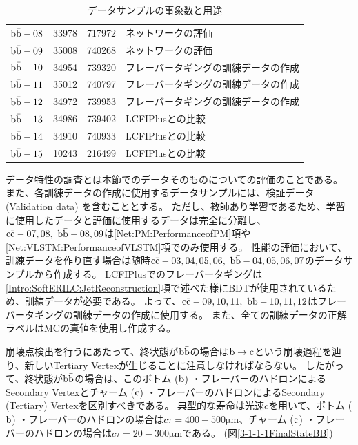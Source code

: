 \begin{table}[htb]
\begin{tabular}{c c c l}
    $\rm b\bar{b}-08$ & 33978 & 717972 & ネットワークの評価\\ 
    $\rm b\bar{b}-09$ & 35008 & 740268 & ネットワークの評価\\ \hline
    $\rm b\bar{b}-10$ & 34954 & 739320 & フレーバータギングの訓練データの作成\\ 
    $\rm b\bar{b}-11$ & 35012 & 740797 & フレーバータギングの訓練データの作成\\ 
    $\rm b\bar{b}-12$ & 34972 & 739953 & フレーバータギングの訓練データの作成\\ \hline
    $\rm b\bar{b}-13$ & 34986 & 739402 & LCFIPlusとの比較\\ 
    $\rm b\bar{b}-14$ & 34910 & 740933 & LCFIPlusとの比較\\ 
    $\rm b\bar{b}-15$ & 10243 & 216499 & LCFIPlusとの比較\\ \hline
  \end{tabular}
  \caption{データサンプルの事象数と用途}
  \label{DataSamples}
\end{table}

データ特性の調査とは本節でのデータそのものについての評価のことである。
また、各訓練データの作成に使用するデータサンプルには、検証データ (Validation data) を含むこととする。
ただし、教師あり学習であるため、学習に使用したデータと評価に使用するデータは完全に分離し、$\rm c\bar{c}-07,08,\ \rm b\bar{b}-08,09$は\ref{Net:PM:PerformanceofPM}項や\ref{Net:VLSTM:PerformanceofVLSTM}項でのみ使用する。
性能の評価において、訓練データを作り直す場合は随時$\rm c\bar{c}-03,04,05,06,\ \rm b\bar{b}-04,05,06,07$のデータサンプルから作成する。
LCFIPlusでのフレーバータギングは\ref{Intro:SoftERILC:JetReconstruction}項で述べた様にBDTが使用されているため、訓練データが必要である。
よって、$\rm c\bar{c}-09,10,11,\ \rm b\bar{b}-10,11,12$はフレーバータギングの訓練データの作成に使用する。
また、全ての訓練データの正解ラベルはMCの真値を使用し作成する。

崩壊点検出を行うにあたって、終状態が$\rm b\bar{b}$の場合は$\rm b \to c$という崩壊過程を辿り、新しいTertiary Vertexが生じることに注意しなければならない。
したがって、終状態が$\rm b\bar{b}$の場合は、このボトム ($\rm b$) ・フレーバーのハドロンによるSecondary Vertexとチャーム ($\rm c$) ・フレーバーのハドロンによるSecondary (Tertiary) Vertexを区別すべきである。
典型的な寿命は光速$c$を用いて、ボトム ($\rm b$) ・フレーバーのハドロンの場合は$c \tau = 400-500 \mathrm{\mu m}$、チャーム ($\rm c$) ・フレーバーのハドロンの場合は$c \tau = 20-300 \mathrm{\mu m}$である。 (図\ref{3-1-1-1FinalStateBB})


